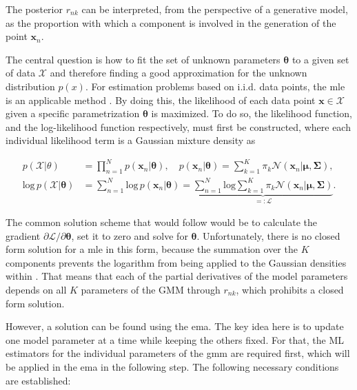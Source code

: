 \documentclass[../../../main.tex]{subfiles}
\begin{document}
The posterior $r_{nk}$ can be interpreted, from the perspective of a generative model, as the proportion with which a component is involved in the generation of the point $\bm{x}_n$.

The central question is how to fit the set of unknown parameters $\bm{\theta}$ to a given set of data $\mathcal{X}$ and therefore finding a good approximation for the unknown distribution $p(x)$. For estimation problems based on i.i.d. data points, the \gls{mle} is an applicable method \cite[p. 317]{dei_2020}. By doing this, the likelihood of each data point $\bm{x} \in \mathcal{X}$ given a specific parametrization $\bm{\theta}$ is maximized. To do so, the likelihood function, and the log-likelihood function respectively, must first be constructed, where each individual likelihood term is a Gaussian mixture density as

\begin{equation*}
    \begin{aligned}
        p(\mathcal{X}|\theta) &= \prod\limits_{n=1}^Np(\bm{x}_n|\bm{\theta}), \quad p(\bm{x}_n|\bm{\theta})=\sum\limits^K_{k=1}\pi_k\mathcal{N}(\bm{x}_n| \bm{\mu}, \bm{\Sigma}),\\[5pt]
        \mathrm{log} \, p(\mathcal{X}|\bm{\theta}) &= \sum\limits_{n=1}^N \mathrm{log} \, p(\bm{x}_n|\bm{\theta}) = \underbrace{ \sum\limits_{n=1}^N \mathrm{log} \sum\limits_{k=1}^K \pi_k \mathcal{N}(\bm{x}_n | \bm{\mu}, \bm{\Sigma})}_{=:\mathcal{L}}.
    \end{aligned}
\end{equation*}

The common solution scheme that would follow would be to calculate the gradient $\partial{\mathcal{L}}/\partial{\bm{\theta}}$, set it to zero and solve for $\bm{\theta}$. Unfortunately, there is no closed form solution for a \gls{mle} in this form, because the summation over the $K$ components prevents the logarithm from being applied to the Gaussian densities within \cite[p. 435]{bis_2006}. That means that each of the partial derivatives of the model parameters depends on all $K$ parameters of the GMM through $r_{nk}$, which prohibits a closed form solution. 

However, a solution can be found using the \gls{ema}. The key idea here is to update one model parameter at a time while keeping the others fixed. For that, the ML estimators for the individual parameters of the \gls{gmm} are required first, which will be applied in the \gls{ema} in the following step. The following necessary conditions are established:
\end{document}
